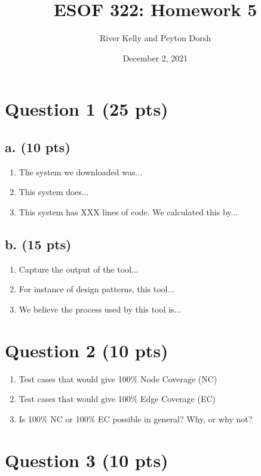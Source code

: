 \documentclass[12pt]{article}
\title{ESOF 322: Homework 5}
\author{River Kelly and Peyton Dorsh}
\date{December 2, 2021}
\begin{document}
\maketitle

\newpage
\section*{Question 1 (25 pts)}

\subsection*{a. (10 pts)}
\begin{enumerate}
    \item The system we downloaded was...
    \item This system does...
    \item This system has XXX lines of code. We calculated this by...
\end{enumerate}

\subsection*{b. (15 pts)}
\begin{enumerate}
    \item Capture the output of the tool...
    \item For instance of design patterns, this tool...
    \item We believe the process used by this tool is...
\end{enumerate}

\newpage
\section*{Question 2 (10 pts)}

\begin{enumerate}
    \item Test cases that would give 100\% Node Coverage (NC)
    \item Test cases that would give 100\% Edge Coverage (EC)
    \item Is 100\% NC or 100\% EC possible in general? Why, or why not?
\end{enumerate}

\newpage
\section*{Question 3 (10 pts)}
\end{document}
